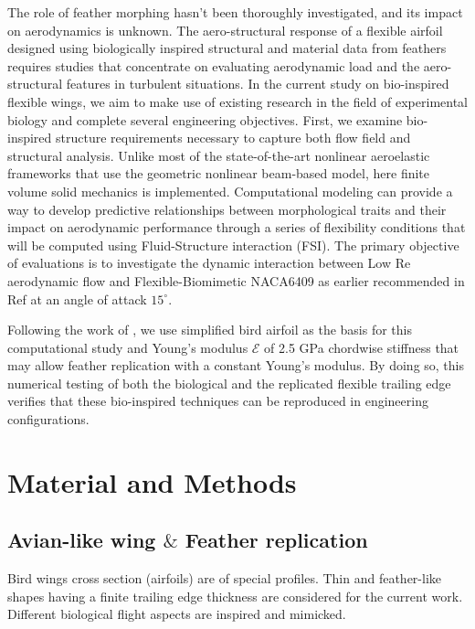 \documentclass[conf]{new-aiaa}
\begin{document}
The role of feather morphing hasn't been thoroughly investigated, and its impact on aerodynamics is unknown.
%
The aero-structural response of a flexible airfoil designed using biologically inspired structural and material data from feathers requires studies that concentrate on evaluating aerodynamic load and the aero-structural features in turbulent situations.
%
In the current study on bio-inspired flexible wings, we aim to make use of existing research in the field of experimental biology and complete several engineering objectives.
%
First, we examine bio-inspired structure requirements necessary to capture both flow field and structural analysis.
%
Unlike most of the state-of-the-art nonlinear aeroelastic frameworks that use the geometric nonlinear beam-based model, here finite volume solid mechanics is implemented.
%
Computational modeling can provide a way to develop predictive relationships between morphological traits and their impact on aerodynamic performance through a series of flexibility conditions that will be computed using Fluid-Structure interaction (FSI).
%
The primary objective of evaluations is to investigate the dynamic interaction between Low Re aerodynamic flow and Flexible-Biomimetic NACA6409 as earlier recommended in Ref \cite{gamble2020load} at an angle of attack $15^{\circ}$.
%

%
Following the work of \citet{gamble2020load}, we use simplified bird airfoil as the basis for this computational study and Young's modulus $\mathcal{E}$ of 2.5 GPa chordwise stiffness that may allow feather replication with a constant Young's modulus.
%
By doing so, this numerical testing of both the biological and the replicated flexible trailing edge verifies that these
bio-inspired techniques can be reproduced in engineering configurations.

\section{Material and Methods}


\subsection{Avian-like wing $\&$ Feather replication}

Bird wings cross section (airfoils) are of special profiles.
%
Thin and feather-like shapes having a finite trailing edge thickness are considered for the current work. 
%
Different biological flight aspects are inspired and mimicked. 
\end{document}

